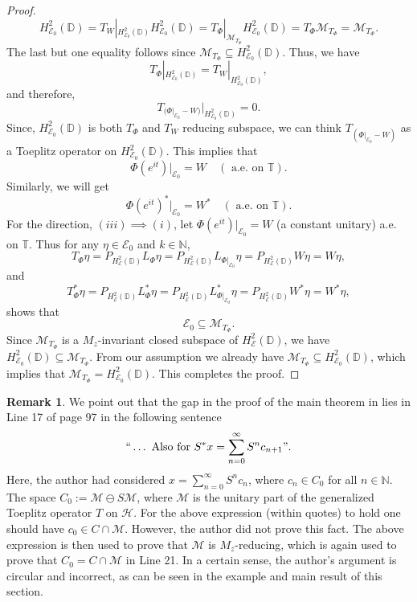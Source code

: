\documentclass[12pt]{amsart}
\numberwithin{equation}{section}
\theoremstyle{definition}
\newtheorem{rem}{Remark}[section]
\newcommand{\Nat}{\mathbb{N}}
\newcommand{\D}{\mathbb{D}}
\newcommand{\T}{\mathbb{T}}
\newcommand{\1}{{\mbox{\bf 1}}}
\newcommand{\cle}{\mathcal{E}}
\newcommand{\clh}{\mathcal{H}}
\newcommand{\clm}{\mathcal{M}}
\begin{document}
\begin{proof}
\[
H_{\cle_0}^2(\D) = T_{W}|_{H_{\cle_0}^2(\D)} H_{\cle_0}^2(\D) = T_{\Phi}|_{\clm_{T_{\Phi}}} H_{\cle_0}^2(\D)  = T_{\Phi} \clm_{T_{\Phi}} =  \clm_{T_{\Phi}}.
\]
The last but one equality follows since $\clm_{T_{\Phi}} \subseteq H_{\cle_0}^2(\D)$.  Thus, we have 
\[
T_{\Phi} |_{H_{\cle_0}^2(\D)}  = T_{W} |_{H_{\cle_0}^2(\D)},
\]
and therefore, 
\[
T_{{(\Phi |_{\cle_0}} - W)} |_{H_{\cle_0}^2(\D)} = 0.
\]
Since, $H_{\cle_0}^2(\D)$ is both $T_{\Phi}$ and $T_{W}$ reducing subspace, we can think $T_{(\Phi |_{\cle_0} - W)}$ as a Toeplitz operator on $H_{\cle_0}^2(\D)$. This implies that
\[
\Phi(e^{it})|_{\cle_0} = W \quad (\text{ a.e. on } \T).
\]
Similarly, we will get
\[
\Phi(e^{it})^*|_{\cle_0} = W^* \quad (\text{ a.e. on } \T).
\]
For the direction, $(iii) \implies (i)$, let $\Phi(e^{it})|_{\cle_0} = W$ (a constant unitary) a.e. on $\T$. Thus for any $\eta \in \cle_0$ and $k \in \Nat$,
\[
T_{\Phi} \eta = P_{H_{\cle}^2(\D)}  L_{\Phi}  \eta = P_{H_{\cle}^2(\D)}   L_{\Phi|_{\cle_0}} \eta = P_{H_{\cle}^2(\D)}   W \eta =  W \eta,
\]
and 
\[
T_{\Phi}^*  \eta = P_{H_{\cle}^2(\D)} L_{\Phi}^*  \eta = P_{H_{\cle}^2(\D)}  L_{\Phi|_{\cle_0}}^* \eta = P_{H_{\cle}^2(\D)} W^* \eta =  W^* \eta,
\]
shows that
\[
\cle_0 \subseteq \clm_{T_{\Phi}}.
\]
Since $\clm_{T_{\Phi}}$ is a $M_z$-invariant closed subspace of $H_{\cle}^2(\D)$, we have $H_{\cle_0}^2(\D) \subseteq \clm_{T_{\Phi}}$. From our assumption we already have $\clm_{T_{\Phi}} \subseteq H_{\cle_0}^2(\D)$, which implies that $\clm_{T_{\Phi}} = H_{\cle_0}^2(\D)$. This completes the proof.
\end{proof}

\begin{rem}
We point out that the gap in the proof of the main theorem in \cite{Butz} lies in Line 17 of page 97 in the following sentence
\[
`` \ldots \text{ Also for } S^*x = \sum_{n=0}^{\infty} S^n c_{n+1} ".
\]
Here, the author had considered $x= \sum_{n=0}^{\infty} S^n c_n$, where $c_n \in C_0$ for all $n \in \Nat$.  The space $C_0 := \clm \ominus S\clm$, where $\clm$ is the unitary part of the generalized Toeplitz operator $T$ on $\clh$. For the above expression (within quotes) to hold one should have $c_0 \in C \cap \clm$. However, the author did not prove this fact. The above expression is then used to prove that $\clm$ is $M_z$-reducing, which is again used to prove that $C_0 = C \cap \clm $ in Line 21.  In a certain sense,  the author's argument is circular and incorrect, as can be seen in the example and main result of this section.
\end{rem}
\end{document}
